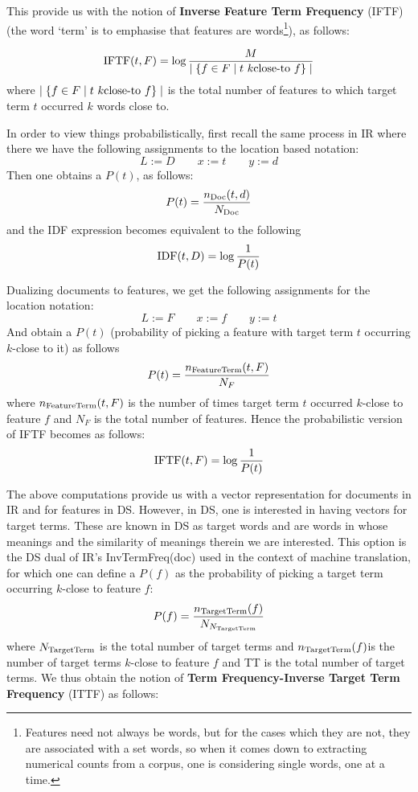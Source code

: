 This provide  us with the notion of {\bf Inverse Feature Term Frequency}  (IFTF)  (the word `term'  is to emphasise that features are words\footnote{Features need not always be words, but for the cases which they are not, they are associated with a set words, so when it comes down to extracting numerical counts from a corpus, one is considering single words, one at a time. }),   as follows:

\begin{equation}
\label{iftf}
\textmd{IFTF}(t, F) = \log{{M} \over {\mid \{f \in F \mid t  \ k\textmd{close-to} \ f \} \mid}}
\end{equation}
where $ \mid \{f \in F \mid t  \ k\textmd{close-to} \ f \} \mid$ is the total number of features to which target  term $t$ occurred $k$ words close to. 

In order to view things probabilistically, first recall the same process in IR where there we have the following assignments to the location based notation:
\[
L := D\qquad
x := t \qquad y := d
\]
Then one obtains  a $P(t)$,  as follows:
\[
P(t) = \frac{n_{\textmd{Doc}}(t,d)}{N_{\textmd{Doc}}} 
\]
and the IDF expression becomes equivalent to the following 
\[
\textmd{IDF} (t, D) = \log{\frac{1}{P(t)}}
\]



Dualizing   documents   to  features,  we get the following assignments for the location notation:
\[
L := F \qquad
x := f\qquad
y := t
\]
And obtain a    $P(t)$ (probability of picking a feature with target term $t$ occurring $k$-close to it) as follows
\[
P(t) = \frac{n_{\textmd{FeatureTerm}}(t,F)}{N_F} 
\]
where $n_{\textmd{FeatureTerm}}(t,F)$ is the number of times target term $t$ occurred $k$-close to feature $f$ and $N_F$ is the total number of features. Hence the probabilistic version of IFTF becomes as follows:
\[
\textmd{IFTF}(t, F) =  \log{\frac{1}{P(t)}}
\]

\medskip
The above computations provide us with a vector representation for documents in IR and for features in DS. However, in DS, one is interested in having vectors for target terms. These are known in DS as target words and  are words in whose meanings and the similarity of meanings therein we are interested.  This  option is the DS dual of IR's  InvTermFreq(doc) used in the context of machine translation, for which one can define a $P(f)$ as the  probability of picking a target term  occurring $k$-close to feature $f$: 
\[
P(f) = \frac{n_{\textmd{TargetTerm}}(f)}{N_{N_{\textmd{TargetTerm}}}}
\]
where  $N_{\textmd{TargetTerm}}$ is the total number of target terms and   $n_{\textmd{TargetTerm}}(f)$is the number of target terms  $k$-close to feature $f$ and TT is the total number of target terms. We thus obtain the notion of  {\bf Term Frequency-Inverse Target Term Frequency} (ITTF) as follows:

